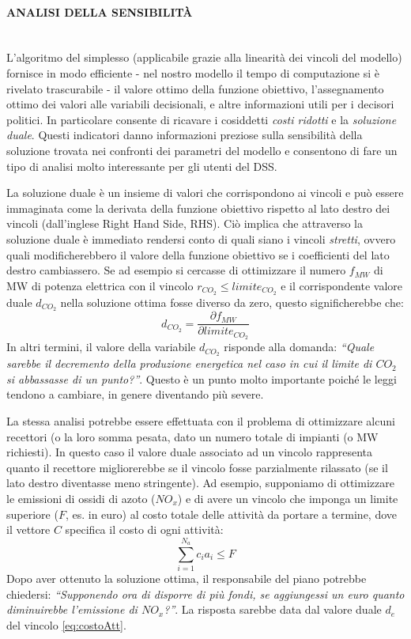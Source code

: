 \documentclass[12pt,a4paper,openright,twoside]{report}
\newcommand{\myparagraph}[1]{\paragraph{#1}\mbox{}\\}
\begin{document}
\myparagraph{ANALISI DELLA SENSIBILITÀ}
L'algoritmo del simplesso (applicabile grazie alla linearità dei vincoli del modello) fornisce in modo efficiente - nel nostro modello il tempo di computazione si è rivelato trascurabile - il valore ottimo della funzione obiettivo, l'assegnamento ottimo dei valori alle variabili decisionali, e altre informazioni utili per i decisori politici. In particolare consente di ricavare i cosiddetti \emph{costi ridotti} e la \emph{soluzione duale}. Questi indicatori danno informazioni preziose sulla sensibilità della soluzione trovata nei confronti dei parametri del modello e consentono di fare un tipo di analisi molto interessante per gli utenti del DSS.

La soluzione duale è un insieme di valori che corrispondono ai vincoli e può essere immaginata come la derivata della funzione obiettivo rispetto al lato destro dei vincoli (dall'inglese Right Hand Side, RHS). Ciò implica che attraverso la soluzione duale è immediato rendersi conto di quali siano i vincoli \emph{stretti}, ovvero quali modificherebbero il valore della funzione obiettivo se i coefficienti del lato destro cambiassero. Se ad esempio si cercasse di ottimizzare il numero $f_{MW}$ di MW di potenza elettrica con il vincolo $r_{CO_2} \leq limite_{CO_2}$ e il corrispondente valore duale $d_{CO_2}$ nella soluzione ottima fosse diverso da zero, questo significherebbe che:
\begin{equation}
\label{eq:sensAnal}
	d_{CO_2} = \frac{\partial f_{MW}}{\partial limite_{CO_2}}
\end{equation}
In altri termini, il valore della variabile $d_{CO_2}$ risponde alla domanda: \emph{``Quale sarebbe il decremento della produzione energetica nel caso in cui il limite di $CO_2$ si abbassasse di un punto?''}. Questo è un punto molto importante poiché le leggi tendono a cambiare, in genere diventando più severe. 

La stessa analisi potrebbe essere effettuata con il problema di ottimizzare alcuni recettori (o la loro somma pesata, dato un numero totale di impianti (o MW richiesti). In questo caso il valore duale associato ad un vincolo rappresenta quanto il recettore migliorerebbe se il vincolo fosse parzialmente rilassato (se il lato destro diventasse meno stringente). Ad esempio, supponiamo di ottimizzare le emissioni di ossidi di azoto ($NO_x$) e di avere un vincolo che imponga un limite superiore ($F$, es. in euro) al costo totale delle attività da portare a termine, dove il vettore $C$ specifica il costo di ogni attività: 
\begin{equation}
\label{eq:costoAtt}
	\sum_{i=1}^{N_a} c_i a_i \leq F
\end{equation}
Dopo aver ottenuto la soluzione ottima, il responsabile del piano potrebbe chiedersi: \emph{``Supponendo ora di disporre di più fondi, se aggiungessi un euro quanto diminuirebbe l'emissione di $NO_x$?''}. La risposta sarebbe data dal valore duale $d_e$ del vincolo \ref{eq:costoAtt}.
\end{document}
